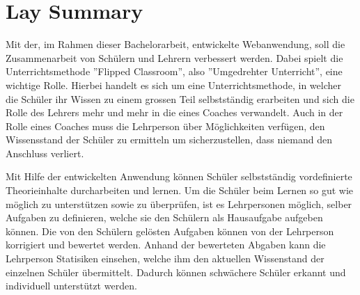 \section*{Lay Summary}

Mit der, im Rahmen dieser Bachelorarbeit, entwickelte Webanwendung, soll die Zusammenarbeit von Schülern und Lehrern verbessert werden. Dabei spielt die Unterrichtsmethode ''Flipped Classroom'', also ''Umgedrehter Unterricht'', eine wichtige Rolle. Hierbei handelt es sich um eine Unterrichtsmethode, in welcher die Schüler ihr Wissen zu einem grossen Teil selbstständig erarbeiten und sich die Rolle des Lehrers mehr und mehr in die eines Coaches verwandelt. Auch in der Rolle eines Coaches muss die Lehrperson über Möglichkeiten verfügen, den Wissensstand der Schüler zu ermitteln um sicherzustellen, dass niemand den Anschluss verliert.


Mit Hilfe der entwickelten Anwendung können Schüler selbstständig vordefinierte Theorieinhalte durcharbeiten und lernen. Um die Schüler beim Lernen so gut wie möglich zu unterstützen sowie zu überprüfen, ist es Lehrpersonen möglich, selber Aufgaben zu definieren, welche sie den Schülern als Hausaufgabe aufgeben können. Die von den Schülern gelösten Aufgaben können von der Lehrperson korrigiert und bewertet werden. Anhand der bewerteten Abgaben kann die Lehrperson Statisiken einsehen, welche ihm den aktuellen Wissenstand der einzelnen Schüler übermittelt. Dadurch können schwächere Schüler erkannt und individuell unterstützt werden. 


\newpage